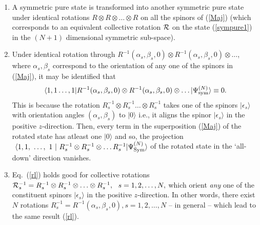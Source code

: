 \documentclass[pra,preprint,a4paper,superscriptaddress]{revtex4}
\begin{document}
{\begin{enumerate}
\item A symmetric pure state is transformed into another symmetric pure state under identical rotations 
$R\otimes R\otimes \ldots \otimes R$ on all the spinors of (\ref{Maj}) (which corresponds  to an equivalent collective rotation  
${\cal R}$ on the state (\ref{sympure1}) in the $(N+1)$ dimensional symmetric sub-space). 
\item Under identical rotation through $R^{-1}(\alpha_s,\beta_s,0)\otimes R^{-1}(\alpha_s,\beta_s,0)\otimes 
\ldots  $, where $\alpha_s, \beta_s$ correspond to the orientation of any one of the spinors in (\ref{Maj}), it may 
be identified that 
\begin{equation}
\label{rl}
\langle 1,1\ldots , 1\vert R^{-1}(\alpha_s,\beta_s,0)\otimes R^{-1}(\alpha_s,\beta_s,0)\otimes 
\ldots   \vert \Psi^{(N)}_{\rm sym}\rangle\equiv 0.
\end{equation}
This is because the rotation $R_s^{-1}\otimes R_s^{-1}\ldots \otimes R_s^{-1}$ takes one of the spinors $\vert \epsilon_s\rangle$ with orientation angles $(\alpha_s, \beta_s)$ to $\vert 0\rangle$ i.e., it aligns the spinor $\vert \epsilon_s\rangle$ in the positive $z$-direction. 
Then, every   term in the  superposition (\ref{Maj}) of the rotated state has atleast one 
$\vert 0\rangle$ and so, the projection $~\langle 1,1,~\ldots,~ 1~\vert~ 
R_s^{-1}\otimes R_s^{-1}\otimes 
\ldots R_s^{-1}\vert \Psi^{(N)}_{\rm Sym}\rangle$ of the rotated state in the `all-down' direction
 vanishes. 
\item Eq.~(\ref{rl}) holds good for  collective rotations ${\cal R}_s^{-1}=R^{-1}_s\otimes 
R^{-1}_s\otimes\ldots\otimes 
R^{-1}_s,\ \ s=1,2,\ldots, N,$ which orient {\em any} one of the constituent  
spinors $\vert\epsilon_s\rangle$ in the positive $z$-direction. In other words, there exist $N$ rotations 
$R^{-1}_s=R^{-1}(\alpha_s,\beta_s,0), s=1,2,\ldots , N$ -- in general -- which lead to the same result  (\ref{rl}). 
  

\end{enumerate}}
\end{document}
